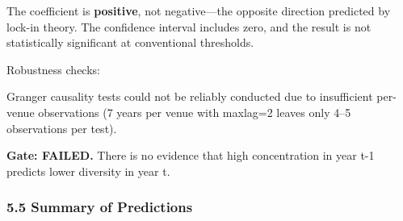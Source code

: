 The coefficient is \textbf{positive}, not negative---the opposite direction predicted by lock-in theory. The confidence interval includes zero, and the result is not statistically significant at conventional thresholds.

Robustness checks:

\begin{table}[htbp]
\centering
{}
\end{table}

Granger causality tests could not be reliably conducted due to insufficient per-venue observations (7 years per venue with maxlag=2 leaves only 4--5 observations per test).

\textbf{Gate: FAILED.} There is no evidence that high concentration in year t-1 predicts lower diversity in year t.

\subsubsection{5.5 Summary of Predictions}

\begin{table}[htbp]
\centering
{}
\end{table}

